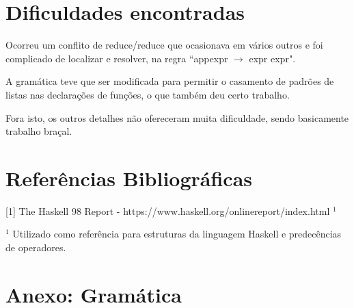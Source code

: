 \documentclass[11pt]{article}
\begin{document}
\pagebreak

\section{Dificuldades encontradas}

Ocorreu um conflito de reduce/reduce que ocasionava em vários outros e foi complicado de
localizar e resolver, na regra ``appexpr $\rightarrow$ expr expr".

A gramática teve que ser modificada para permitir o casamento de padrões de listas nas declarações de funções, o que também deu certo trabalho.

Fora isto, os outros detalhes não ofereceram muita dificuldade, sendo basicamente trabalho
braçal.

\section{Referências Bibliográficas}
[1] The Haskell 98 Report - https://www.haskell.org/onlinereport/index.html $^1$

$^1$ Utilizado como referência para estruturas da linguagem Haskell e predecências de operadores.

\section{Anexo: Gramática}
\end{document}
